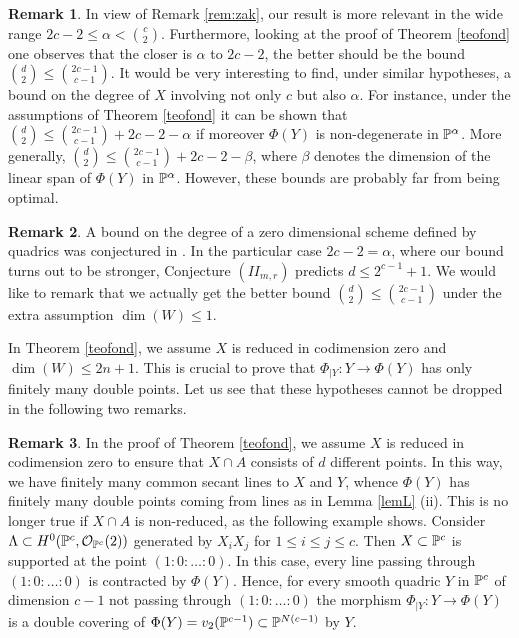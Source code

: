 \documentclass{amsart}
\theoremstyle{definition}
\newtheorem{remark}{Remark}
\begin{document}
\begin{remark}
In view of Remark \ref{rem:zak}, our result is more relevant in the
wide range $2c-2\leq \alpha < \binom{c}{2}$. Furthermore, looking at
the proof of Theorem \ref{teofond} one observes that the closer is
$\alpha$ to $2c-2$, the better should be the bound $\binom{d}{2}\leq
\binom{2c-1}{c-1}$. It would be very interesting to find, under
similar hypotheses, a bound on the degree of $X$ involving not only
$c$ but also $\alpha$. For instance, under the assumptions of
Theorem \ref{teofond} it can be shown that
$\binom{d}{2}\leq\binom{2c-1}{c-1} + 2c-2 - \alpha$ if moreover
$\Phi(Y)$ is non-degenerate in $\Bbb P^{\alpha}$. More generally,
$\binom{d}{2}\leq \binom{2c-1}{c-1} + 2c-2 - \beta$, where $\beta$
denotes the dimension of the linear span of $\Phi(Y)$ in $\Bbb
P^{\alpha}$. However, these bounds are probably far from being
optimal.
\end{remark}

\begin{remark}\label{rem:egh}
A bound on the degree of a zero dimensional scheme defined by
quadrics was conjectured in \cite[Conjecture $(II_{m,r})$]{e-g-h}.
In the particular case $2c-2=\alpha$, where our bound turns out to
be stronger, Conjecture $(II_{m,r})$ predicts $d\leq 2^{c-1}+1$. We
would like to remark that we actually get the better bound
$\binom{d}{2}\leq \binom{2c-1}{c-1}$ under the extra assumption
$\dim(W)\leq 1$.
\end{remark}

In Theorem \ref{teofond}, we assume $X$ is reduced in codimension
zero and $\dim(W)\leq 2n+1$. This is crucial to prove that
$\Phi_{|Y}:Y\to\Phi(Y)$ has only finitely many double points. Let us
see that these hypotheses cannot be dropped in the following two
remarks.

\begin{remark}
In the proof of Theorem \ref{teofond}, we assume $X$ is reduced in
codimension zero to ensure that $X\cap A$ consists of $d$ different
points. In this way, we have finitely many common secant lines to
$X$ and $Y$, whence $\Phi(Y)$ has finitely many double points coming
from lines as in Lemma \ref{lemL} (ii). This is no longer true if
$X\cap A$ is non-reduced, as the following example shows. Consider
$\Lambda\subset H^0(\Bbb P^c,{{\mathcal O}}_{\Bbb P^c}(2))$ generated by
$X_iX_j$ for $1\leq i\leq j\leq c$. Then $X\subset\Bbb P^c$ is
supported at the point $(1:0:\dots:0)$. In this case, every line
passing through $(1:0:\dots:0)$ is contracted by $\Phi(Y)$. Hence,
for every smooth quadric $Y$ in $\Bbb P^c$ of dimension $c-1$ not
passing through $(1:0:\dots:0)$ the morphism $\Phi_{|Y}:Y\to\Phi(Y)$
is a double covering of $\Phi(Y)=v_2(\Bbb P^{c-1})\subset\Bbb
P^{N(c-1)}$ by $Y$.
\end{remark}
\end{document}
